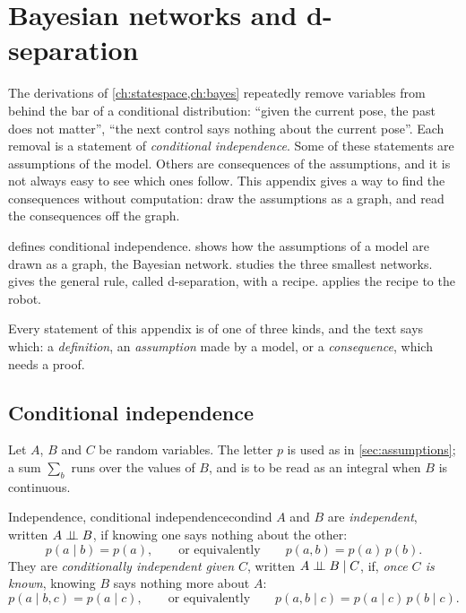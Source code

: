 \chapter{Bayesian networks and d-separation}
\label{app:bayesnet}

The derivations of \cref{ch:statespace,ch:bayes} repeatedly remove
variables from behind the bar of a conditional distribution: ``given the
current pose, the past does not matter'', ``the next control says nothing
about the current pose''. Each removal is a statement of \emph{conditional
independence}. Some of these statements are assumptions of the model.
Others are consequences of the assumptions, and it is not always easy to
see which ones follow. This appendix gives a way to find the consequences
without computation: draw the assumptions as a graph, and read the
consequences off the graph.

 defines conditional independence.  shows
how the assumptions of a model are drawn as a graph, the Bayesian network.
 studies the three smallest networks. 
gives the general rule, called d-separation, with a recipe.
 applies the recipe to the robot.

Every statement of this appendix is of one of three kinds, and the text
says which: a \emph{definition}, an \emph{assumption} made by a model, or a
\emph{consequence}, which needs a proof.

\section{Conditional independence}
\label{sec:condind}

Let $A$, $B$ and $C$ be random variables. The letter $p$ is used as in
\cref{sec:assumptions}; a sum $\sum_b$ runs over the values of $B$, and is
to be read as an integral when $B$ is continuous.

\begin{definition}{Independence, conditional independence}{condind}
$A$ and $B$ are \emph{independent}, written $A\mathrel{\perp\!\!\!\perp} B$, if knowing one
says nothing about the other:
\[
  p(a\mid b)=p(a),\qquad\text{or equivalently}\qquad p(a,b)=p(a)\,p(b).
\]
They are \emph{conditionally independent given $C$}, written
$A\mathrel{\perp\!\!\!\perp} B\mid C$, if, \emph{once $C$ is known}, knowing $B$ says nothing
more about $A$:
\[
  p(a\mid b,c)=p(a\mid c),\qquad\text{or equivalently}\qquad
  p(a,b\mid c)=p(a\mid c)\,p(b\mid c).
\]
\end{definition}

